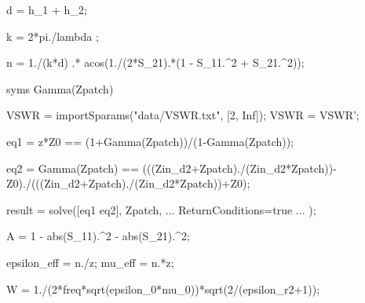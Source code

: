 
\begin{matlabcode}
d = h_1 + h_2; 

k = 2*pi./lambda ;%

n = 1./(k*d) .* acos(1./(2*S_21).*(1 - S_11.^2 + S_21.^2));
\end{matlabcode}



\begin{matlabcode}
syms Gamma(Zpatch)

VSWR = importSparams("data/VSWR.txt", [2, Inf]); VSWR = VSWR';

eq1 = z*Z0 == (1+Gamma(Zpatch))/(1-Gamma(Zpatch));
\end{matlabcode}



\begin{matlabcode}
eq2 = Gamma(Zpatch) == (((Zin_d2+Zpatch)./(Zin_d2*Zpatch))-Z0)./(((Zin_d2+Zpatch)./(Zin_d2*Zpatch))+Z0);

result = solve([eq1 eq2], Zpatch, ...
    ReturnConditions=true ... %
);
\end{matlabcode}



\begin{matlabcode}
A = 1 - abs(S_11).^2 - abs(S_21).^2;
\end{matlabcode}



\begin{matlabcode}
epsilon_eff = n./z; mu_eff = n.*z;
\end{matlabcode}



\begin{matlabcode}
W = 1./(2*freq*sqrt(epsilon_0*mu_0))*sqrt(2/(epsilon_r2+1));
\end{matlabcode}


